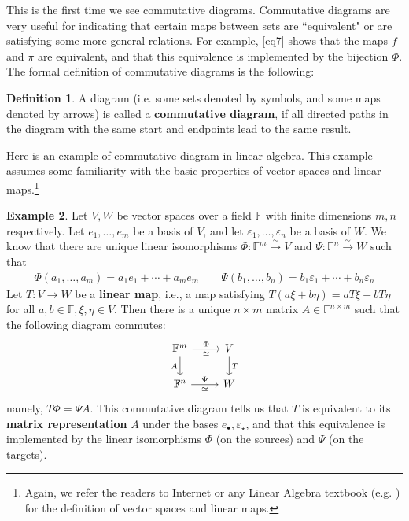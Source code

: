 \documentclass[12pt,b5paper,notitlepage]{article}
\theoremstyle{definition}
\newtheorem{df}{Definition}[section]
\newtheorem{eg}[df]{Example}
\theoremstyle{plain}
\newcommand{\blt}{\bullet}
\newcommand{\Fbb}{\mathbb F}
\newcommand{\eps}{\varepsilon}
\numberwithin{equation}{section}
\begin{document}
This is the first time we see commutative diagrams. Commutative diagrams are very useful for indicating that certain maps between sets are ``equivalent" or are satisfying some more general relations. For example, \eqref{eq7} shows that the maps $f$ and $\pi$ are equivalent, and that this equivalence is implemented by the bijection $\Phi$. The formal definition of commutative diagrams is the following:


\begin{df}
A diagram (i.e. some sets denoted by symbols, and some maps denoted by arrows) is called a \textbf{commutative diagram},  if all directed paths in the diagram with the same start and endpoints lead to the same result.
\end{df}


Here is an example of commutative diagram in linear algebra. This example assumes some familiarity with the basic properties of vector spaces  and linear maps.\footnote{Again, we refer the readers to Internet or any Linear Algebra textbook (e.g. \cite{Axl}) for the definition of vector spaces and linear maps.}


\begin{eg}\label{lb67}
Let $V,W$ be vector spaces over a field $\Fbb$ with finite dimensions $m,n$ respectively. Let $e_1,\dots,e_m$ be a basis of $V$, and let $\eps_1,\dots,\eps_n$ be a basis of $W$. We know that there are unique linear isomorphisms $\Phi:\Fbb^m\xrightarrow{\simeq} V$ and $\Psi:\Fbb^n\xrightarrow{\simeq} W$ such that
\begin{align*}
\Phi(a_1,\dots,a_m)=a_1e_1+\cdots+a_me_m\qquad \Psi(b_1,\dots,b_n)=b_1\eps_1+\cdots+b_n\eps_n
\end{align*}
Let $T:V\rightarrow W$ be a  \textbf{linear map}, i.e., a map satisfying $T(a\xi+b\eta)=aT\xi+bT\eta$ for all $a,b\in\Fbb,\xi,\eta\in V$. Then there is a unique $n\times m$ matrix $A\in\Fbb^{n\times m}$ \index{Fnm@$\Fbb^{n\times m}$, the set of $n\times m$ matrices} such that the following diagram commutes:
\begin{equation}
\begin{tikzcd}
\Fbb^m \arrow[r,"\Phi","\simeq"'] \arrow[d,"A"'] & V \arrow[d,"T"] \\
\Fbb^n \arrow[r,"\Psi","\simeq"']           & W          
\end{tikzcd}
\end{equation} 
namely, $T\Phi=\Psi A$. This commutative diagram tells us that $T$ is equivalent to its \textbf{matrix representation}  $A$ under the bases $e_\blt,\eps_\star$, and that this equivalence is implemented by the linear isomorphisms $\Phi$ (on the sources) and $\Psi$ (on the targets). 
\end{eg}
\end{document}
